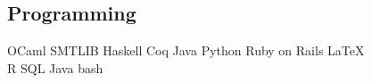 \documentclass[]{deedy-resume-openfont}
\begin{document}
\begin{minipage}[t]{0.33\textwidth}
\subsection{Programming}
OCaml \textbullet SMTLIB \textbullet Haskell \textbullet{} Coq \textbullet{} Java \textbullet{} Python \textbullet{} Ruby on Rails \textbullet{} \LaTeX \\ 
R \textbullet{} SQL \textbullet{} Java \textbullet{} bash \\
\sectionsep




%
%

\end{minipage} 
\hfill
\end{document}

